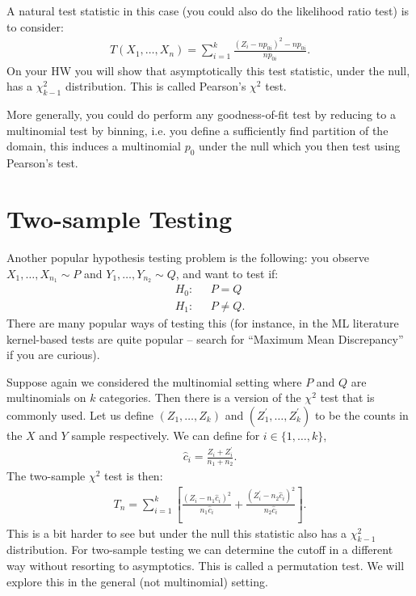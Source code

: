 \documentclass[twoside,12pt]{article}
\begin{document}
A natural test statistic in this case (you could also do the likelihood ratio test) is to consider:
\begin{align*}
T(X_1,\ldots,X_n) = \sum_{i=1}^k \frac{(Z_i - np_{0i})^2 - np_{0i}}{ np_{0i}}. 
\end{align*}
On your HW you will show that asymptotically this test statistic, under the null, has a $\chi^2_{k-1}$ distribution. 
This is called Pearson's $\chi^2$ test.

More generally, you could do perform any goodness-of-fit test by reducing to a multinomial test by binning, i.e. you define a sufficiently find partition of the domain, this induces a multinomial $p_0$ under the null which you then test using Pearson's test.

\section{Two-sample Testing}
Another popular hypothesis testing problem is the following: you observe $X_1,\ldots,X_{n_1} \sim P$ and $Y_1,\ldots,Y_{n_2} \sim Q$, and want to test if:
\begin{align*}
H_0: &~~~P = Q \\
H_1: &~~~P \neq Q.
\end{align*}
There are many popular ways of testing this (for instance, in the ML literature kernel-based tests are quite popular -- search for ``Maximum Mean Discrepancy'' if you are curious).

Suppose again we considered the multinomial setting where $P$ and $Q$ are multinomials on $k$ categories. Then there is a version of the $\chi^2$ test that is commonly used. Let us define $(Z_1,\ldots,Z_k)$ and $(Z_1^{\prime}, \ldots, Z_k^{\prime})$ to be the counts in the $X$ and $Y$ sample respectively. We can define for $i \in \{1,\ldots,k\}$,
\begin{align*}
\widehat{c}_i = \frac{Z_i + Z_i^{\prime}}{n_1 + n_2}.
\end{align*}
The two-sample $\chi^2$ test is then:
\begin{align*}
T_n = \sum_{i=1}^k \left[ \frac{ (Z_i - n_1 \widehat{c}_i)^2}{n_1 \widehat{c}_i} +  \frac{ (Z_i^{\prime} - n_2 \widehat{c}_i)^2}{n_2 \widehat{c}_i} \right].
\end{align*}
This is a bit harder to see but under the null this statistic also has a $\chi^2_{k-1}$ distribution.
For two-sample testing we can determine the cutoff in a different way without resorting to asymptotics. 
This is called a permutation test. We will explore this in the general (not multinomial) setting.
\end{document}
